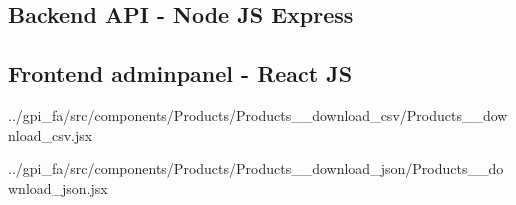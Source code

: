 \documentclass[12pt, a4paper, simple]{eskdtext}
\begin{document}
    
    
    
    \subsection*{Backend API - Node JS Express}
    
    
    
    
    
    
    
    
    
    
    
    \hspace{0pt}

    \subsection*{Frontend adminpanel - React JS}
    
    
    
    
    
    
    
    
    
    
    
    
    
    
        {../gpi_fa/src/components/Products/Products__download_csv/Products__download_csv.jsx}
    
        {../gpi_fa/src/components/Products/Products__download_json/Products__download_json.jsx}
    
    
    
    
\end{document}
